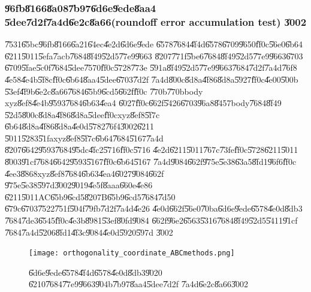 \clearpage%

\subsubsection{\U{96fb}\U{8166}\U{8a08}\U{7b97}\U{6d6e}\U{9ede}\U{8aa4}%
\U{5dee}\U{7d2f}\U{7a4d}\U{6e2c}\U{8a66}(roundoff error accumulation test)%
\U{3002}}

\U{7531}\U{65bc}\U{96fb}\U{8166}\U{6a21}\U{64ec}\U{4e2d}\U{6d6e}\U{9ede}%
\U{6578}\U{7684}\U{4f4d}\U{6578}\U{6709}\U{9650}\U{ff0c}\U{56e0}\U{6b64}%
\U{6211}\U{5011}\U{5efa}\U{7acb}\U{7684}\U{8f49}\U{52d5}\U{77e9}\U{9663}%
\U{8207}\U{771f}\U{5be6}\U{7684}\U{8f49}\U{52d5}\U{77e9}\U{9663}\U{6703}%
\U{6709}\U{5fae}\U{5c0f}\U{7684}\U{5dee}\U{7570}\U{ff0c}\U{5728}\U{773e}%
\U{591a}\U{8f49}\U{52d5}\U{77e9}\U{9663}\U{7684}\U{7d2f}\U{7a4d}\U{76f8}%
\U{4e58}\U{4e4b}\U{5f8c}\U{ff0c}\U{6b64}\U{8aa4}\U{5dee}\U{6703}\U{7d2f}%
\U{7a4d}\U{800c}\U{8d8a}\U{4f86}\U{8d8a}\U{5927}\U{ff0c}\U{4e00}\U{500b}%
\U{53ef}\U{4f9b}\U{6e2c}\U{8a66}\U{7684}\U{65b9}\U{6cd5}\U{662f}\U{ff0c}%
\U{770b}\U{770b}body xyz\U{8ef8}\U{4e4b}\U{9593}\U{7684}\U{6b63}\U{4ea4}%
\U{6027}\U{ff0c}\U{662f}\U{5426}\U{6703}\U{96a8}\U{8457}body\U{7684}\U{8f49}%
\U{52d5}\U{800c}\U{8d8a}\U{4f86}\U{8d8a}\U{5dee}\U{ff0c}xyz\U{8ef8}\U{5f7c}%
\U{6b64}\U{8d8a}\U{4f86}\U{8d8a}\U{4e0d}\U{5782}\U{76f4}\U{3002}\U{6211}%
\U{5011}\U{5283}\U{51fa}xyz\U{8ef8}\U{5f7c}\U{6b64}\U{7684}\U{5167}\U{7a4d}%
\U{8207}\U{6642}\U{9593}\U{7684}\U{95dc}\U{4fc2}\U{5716}\U{ff0c}\U{5716}%
\U{4e2d}\U{6211}\U{5011}\U{767c}\U{73fe}\U{ff0c}\U{5728}\U{6211}\U{5011}%
\U{8003}\U{91cf}\U{7684}\U{6642}\U{9593}\U{5167}\U{ff0c}\U{6b64}\U{5167}%
\U{7a4d}\U{9084}\U{662f}\U{975e}\U{5e38}\U{63a5}\U{8fd1}\U{96f6}\U{ff0c}%
\U{4ee3}\U{8868}xyz\U{8ef8}\U{7684}\U{6b63}\U{4ea4}\U{6027}\U{9084}\U{662f}%
\U{975e}\U{5e38}\U{597d}\U{3002}\U{9019}\U{4e5f}\U{8aaa}\U{660e}\U{4e86}%
\U{6211}\U{5011}AC\U{65b9}\U{6cd5}\U{8207}B\U{65b9}\U{6cd5}\U{7684}\U{7d50}%
\U{679c}\U{6703}\U{7522}\U{751f}\U{504f}\U{79fb}\U{7d2f}\U{7a4d}\U{4e26}%
\U{4e0d}\U{662f}\U{56e0}\U{70ba}\U{6d6e}\U{9ede}\U{6578}\U{4e0d}\U{8db3}%
\U{7684}\U{7de3}\U{6545}\U{ff0c}\U{4e3b}\U{8981}\U{53ef}\U{80fd}\U{9084}%
\U{662f}\U{96e2}\U{6563}\U{5316}\U{7684}\U{8f49}\U{52d5}\U{5411}\U{91cf}%
\U{7684}\U{7a4d}\U{5206}\U{8fd1}\U{4f3c}\U{9084}\U{4e0d}\U{5920}\U{597d}%
\U{3002}

\begin{figure}[th]
\caption{\U{6d6e}\U{9ede}\U{6578}\U{4f4d}\U{6578}\U{4e0d}\U{8db3}\U{9020}%
\U{6210}\U{7684}\U{77e9}\U{9663}\U{904b}\U{7b97}\U{8aa4}\U{5dee}\U{7d2f}%
\U{7a4d}\U{6e2c}\U{8a66}\U{3002}}
\begin{center}
\texttt{[image: orthogonality\_coordinate\_ABCmethods.png]}
\end{center}
\end{figure}

